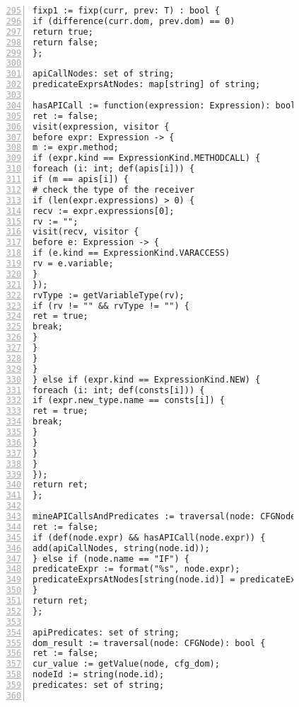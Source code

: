 \begin{figure}[ht!]
\begin{lstlisting}[numbers=left, tabsize=4, escapechar=@, caption={API Precondition Mining Analysis},label={lst:apm-code}, firstline = 295, firstnumber = 295, lastline = 355]
fixp1 := fixp(curr, prev: T) : bool {
if (difference(curr.dom, prev.dom) == 0)
return true;	
return false;
};

apiCallNodes: set of string;
predicateExprsAtNodes: map[string] of string;

hasAPICall := function(expression: Expression): bool {
ret := false;
visit(expression, visitor {
before expr: Expression -> {
m := expr.method;
if (expr.kind == ExpressionKind.METHODCALL) {
foreach (i: int; def(apis[i])) {
if (m == apis[i]) {
# check the type of the receiver
if (len(expr.expressions) > 0) {
recv := expr.expressions[0];
rv := "";
visit(recv, visitor {
before e: Expression -> {
if (e.kind == ExpressionKind.VARACCESS) 
rv = e.variable;
}
});
rvType := getVariableType(rv);
if (rv != "" && rvType != "") {
ret = true;
break;
}
}
}
} 
} else if (expr.kind == ExpressionKind.NEW) {
foreach (i: int; def(consts[i])) {
if (expr.new_type.name == consts[i]) {
ret = true;
break;
}
}
}
}
});
return ret;
};

mineAPICallsAndPredicates := traversal(node: CFGNode): bool { 
ret := false;
if (def(node.expr) && hasAPICall(node.expr)) {
add(apiCallNodes, string(node.id));
} else if (node.name == "IF") {
predicateExpr := format("%s", node.expr);
predicateExprsAtNodes[string(node.id)] = predicateExpr;
}
return ret;
};

apiPredicates: set of string;
dom_result := traversal(node: CFGNode): bool {
ret := false;
cur_value := getValue(node, cfg_dom);
nodeId := string(node.id);
predicates: set of string;


\end{lstlisting}
\end{figure}
